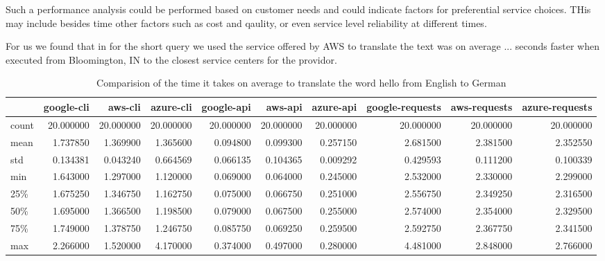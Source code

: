 Such a performance analysis could be performed based on customer needs
and could indicate factors for preferential service choices. THis may
include besides time other factors such as cost and qaulity, or even
service level reliability at different times.

For us we found that in for the short query we used the service
offered by AWS to translate the text was on average ...  seconds
faster when executed from Bloomington, IN to the closest service
centers for the providor.


\begin{table}[htb]

\caption{Comparision of the time it takes on average to translate the word hello from English to German}

\begin{tabular}{lrrrrrrrrr}
 & google-cli & aws-cli & azure-cli & google-api & aws-api & azure-api & google-requests & aws-requests & azure-requests \\
 \hline
count & 20.000000 & 20.000000 & 20.000000 & 20.000000 & 20.000000 & 20.000000 & 20.000000 & 20.000000 & 20.000000 \\
mean & 1.737850 & 1.369900 & 1.365600 & 0.094800 & 0.099300 & 0.257150 & 2.681500 & 2.381500 & 2.352550 \\
std & 0.134381 & 0.043240 & 0.664569 & 0.066135 & 0.104365 & 0.009292 & 0.429593 & 0.111200 & 0.100339 \\
min & 1.643000 & 1.297000 & 1.120000 & 0.069000 & 0.064000 & 0.245000 & 2.532000 & 2.330000 & 2.299000 \\
25\% & 1.675250 & 1.346750 & 1.162750 & 0.075000 & 0.066750 & 0.251000 & 2.556750 & 2.349250 & 2.316500 \\
50\% & 1.695000 & 1.366500 & 1.198500 & 0.079000 & 0.067500 & 0.255000 & 2.574000 & 2.354000 & 2.329500 \\
75\% & 1.749000 & 1.378750 & 1.246750 & 0.085750 & 0.069250 & 0.259500 & 2.592750 & 2.367750 & 2.341500 \\
max & 2.266000 & 1.520000 & 4.170000 & 0.374000 & 0.497000 & 0.280000 & 4.481000 & 2.848000 & 2.766000 \\
\hline
\end{tabular}
\end{table}